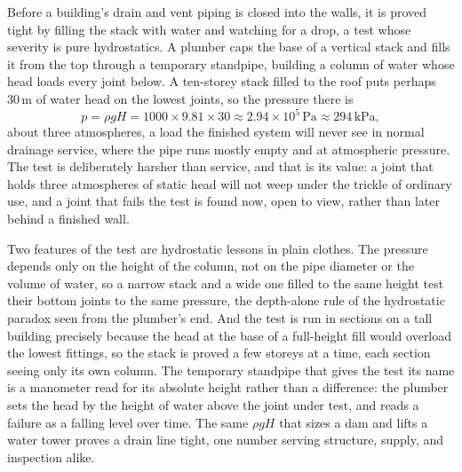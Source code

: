 Before a building's drain and vent piping is closed into the walls, it is
proved tight by filling the stack with water and watching for a drop, a test
whose severity is pure hydrostatics. A plumber caps the base of a vertical
stack and fills it from the top through a temporary standpipe, building a
column of water whose head loads every joint below. A ten-storey stack
filled to the roof puts perhaps $30\,\si{\meter}$ of water head on the
lowest joints, so the pressure there is
\[
p = \rho g H = 1000 \times 9.81 \times 30
\approx 2.94 \times 10^5\,\text{Pa}
\approx 294\,\text{kPa},
\]
about three atmospheres, a load the finished system will never see in normal
drainage service, where the pipe runs mostly empty and at atmospheric
pressure. The test is deliberately harsher than service, and that is its
value: a joint that holds three atmospheres of static head will not weep
under the trickle of ordinary use, and a joint that fails the test is found
now, open to view, rather than later behind a finished wall.

Two features of the test are hydrostatic lessons in plain clothes. The
pressure depends only on the height of the column, not on the pipe diameter
or the volume of water, so a narrow stack and a wide one filled to the same
height test their bottom joints to the same pressure, the depth-alone rule
of the hydrostatic paradox seen from the plumber's end. And the test is run
in sections on a tall building precisely because the head at the base of a
full-height fill would overload the lowest fittings, so the stack is proved
a few storeys at a time, each section seeing only its own column. The
temporary standpipe that gives the test its name is a manometer read for its
absolute height rather than a difference: the plumber sets the head by the
height of water above the joint under test, and reads a failure as a falling
level over time. The same $\rho g H$ that sizes a dam and lifts a water
tower proves a drain line tight, one number serving structure, supply, and
inspection alike.

